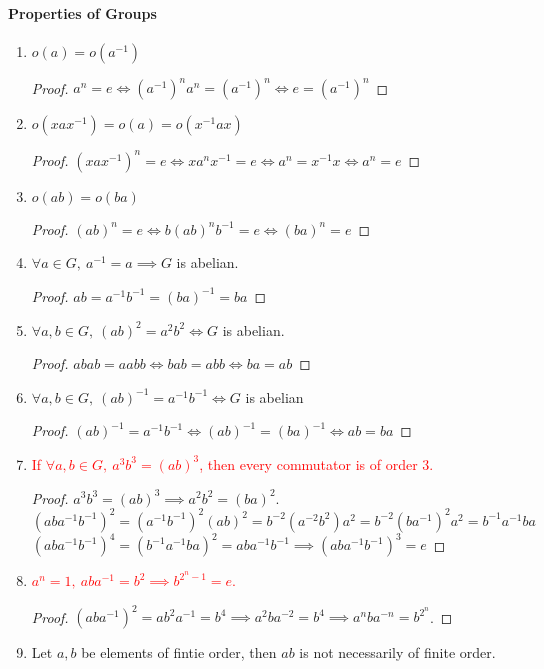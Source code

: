 \paragraph{Properties of Groups}
\begin{enumerate}
	\item $o(a)=o(a^{-1})$
	\begin{proof}
		$a^n = e \iff (a^{-1})^n a^n = (a^{-1})^n \iff e = (a^{-1})^n$
	\end{proof}
	\item $o(xax^{-1}) = o(a) = o(x^{-1}ax)$
	\begin{proof}
		$(xax^{-1})^n = e \iff  xa^nx^{-1} = e \iff a^n = x^{-1}x \iff a^n = e$
	\end{proof}
	\item $o(ab) = o(ba)$
	\begin{proof}
		$(ab)^n = e \iff b(ab)^nb^{-1} = e \iff (ba)^n = e$
	\end{proof}
	\item $\forall a \in G,\ a^{-1} = a \implies G$ is abelian.
	\begin{proof}
		$ab = a^{-1}b^{-1} = (ba)^{-1} = ba$
	\end{proof}
	\item $\forall a,b \in G,\ (ab)^2 = a^2b^2 \iff G$ is abelian.
	\begin{proof}
		$abab = aabb \iff bab = abb \iff ba = ab$
	\end{proof}
	\item $\forall a,b \in G,\ (ab)^{-1} = a^{-1}b^{-1} \iff G$ is abelian
	\begin{proof}
		$(ab)^{-1} = a^{-1}b^{-1} \iff (ab)^{-1} = (ba)^{-1} \iff ab = ba$
	\end{proof}
\item \textcolor{red}{If $\forall a,b \in G,\ a^3b^3 = (ab)^3$, then every commutator is of order $3$.}
	\begin{proof}
	$a^3b^3 = (ab)^3 \implies a^2b^2 = (ba)^2$.
	$$(aba^{-1}b^{-1})^2 = (a^{-1}b^{-1})^2(ab)^2 = b^{-2}(a^{-2}b^2)a^2 = b^{-2}(ba^{-1})^2a^2 = b^{-1}a^{-1}ba$$
		$(aba^{-1}b^{-1})^4 = (b^{-1}a^{-1}ba)^2 = aba^{-1}b^{-1} \implies (aba^{-1}b^{-1})^3 = e$
	\end{proof}
	\item \textcolor{red}{$a^n = 1,\ aba^{-1} = b^2 \implies b^{2^n-1} = e$.}
	\begin{proof}
		$(aba^{-1})^2 = ab^2a^{-1} = b^4 \implies a^2ba^{-2} = b^4 \implies a^nba^{-n}=b^{2^n}$.
	\end{proof}
	\item Let $a,b$ be elements of fintie order, then $ab$ is not necessarily of finite order.

\end{enumerate}
